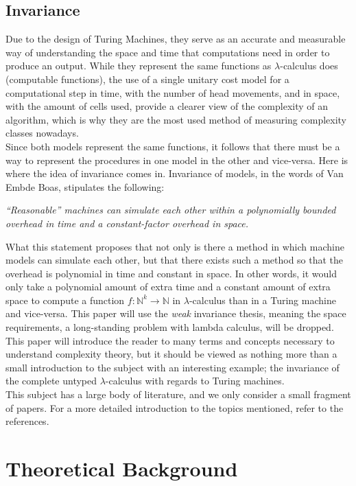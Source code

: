 \message{ !name(VU-CS-BSc-thesis-template.tex)}\documentclass[11pt]{article}
\begin{document}
\subsection{Invariance}
Due to the design of Turing Machines, they serve as an accurate and measurable way of understanding the space and time that computations need in order to produce an output. While they represent the same functions as $\lambda$-calculus does (computable functions), the use of a single unitary cost model for a computational step in time, with the number of head movements, and in space, with the amount of cells used, provide a clearer view of the complexity of an algorithm, which is why they are the most used method of measuring complexity classes nowadays. \\
Since both models represent the same functions, it follows that there must be a way to represent the procedures in one model in the other and vice-versa. Here is where the idea of invariance comes in.
Invariance of models, in the words of Van Embde Boas, stipulates the following:
\begin{center}
 \textit{\enquote{Reasonable} machines can simulate each other within a polynomially
bounded overhead in time and a constant-factor overhead in space.}
\end{center}
What this statement proposes that not only is there a method in which machine models can simulate each other, but that there exists such a method so that the overhead is polynomial in time and constant in space. In other words, it would only take a polynomial amount of extra time and a constant amount of extra space to compute a function $f : \mathbb{N}^k \rightarrow \mathbb{N}$ in $\lambda$-calculus than in a Turing machine and vice-versa.
This paper will use the \textit{weak} invariance thesis, meaning the space requirements, a long-standing problem with lambda calculus, will be dropped.
This paper will introduce the reader to many terms and concepts necessary to understand complexity theory, but it should be viewed as nothing more than a small introduction to the subject with an interesting example; the invariance of the complete untyped $\lambda$-calculus with regards to Turing machines. \\
This subject has a large body of literature, and we only consider a small fragment of papers. For a more detailed introduction to the topics mentioned, refer to the references.

\section{Theoretical Background}\label{theoretical-background}
\end{document}
